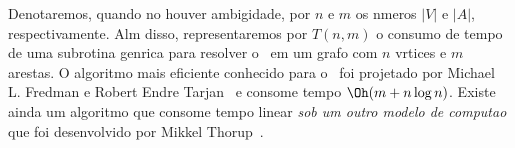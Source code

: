 Denotaremos, quando no houver
ambigidade, por $n$ e $m$ os nmeros $|V|$ e $|A|$, respectivamente.
Alm disso, representaremos por $T(n,m)$ o consumo de tempo de uma
subrotina genrica para resolver o \PCM\ em um grafo com $n$ vrtices
e $m$ arestas.
O algoritmo mais eficiente  conhecido para o \PCM\ foi 
projetado por Michael L. Fredman e Robert Endre
Tarjan~\cite{FredTarjan:Fibonacci}
e consome tempo $\Oh(m + n \log n)$. Existe ainda um algoritmo que consome
tempo linear \textit{sob um outro modelo de computao} que foi
desenvolvido por Mikkel Thorup~\cite{thorup:sssp-1999}.    
